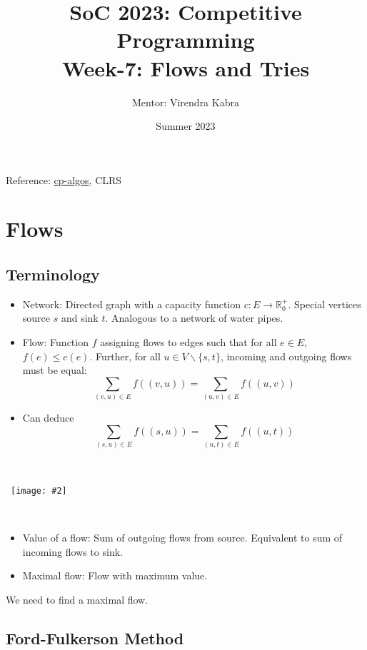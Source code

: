 \documentclass{article}
\title{\textbf{SoC 2023: Competitive Programming \\ {\Large Week-7: Flows and Tries}}}
\author{Mentor: Virendra Kabra}
\date{Summer 2023}
\newcommand{\image}[2]{\
    \begin{center}\
        \texttt{[image: \#2]}\
    \end{center}\
}
\begin{document}
\begin{sloppypar}       %

    \maketitle
    \tableofcontents
    \thispagestyle{empty}

    \newpage

    \noindent Reference: \href{https://cp-algorithms.com/graph/edmonds_karp.html}{cp-algos}, CLRS

    \section{Flows}

    \subsection{Terminology}

    \begin{itemize}
        \item Network: Directed graph with a capacity function $c:E\rightarrow \mathbb{R}^+_0$. Special vertices source $s$ and sink $t$. Analogous to a network of water pipes.
        \item Flow: Function $f$ assigning flows to edges such that for all $e\in E$, $f(e) \le c(e)$. Further, for all $u\in V\backslash \{s,t\}$, incoming and outgoing flows must be equal:
        $$\sum_{(v,u)\in E}f((v,u)) = \sum_{(u,v)\in E}f((u,v))$$
        \item Can deduce $$\sum_{(s,u)\in E}f((s,u)) = \sum_{(u,t)\in E}f((u,t))$$
    \end{itemize}

    \image{0.6}{../images/Flow1.png}

    \begin{itemize}
        \item Value of a flow: Sum of outgoing flows from source. Equivalent to sum of incoming flows to sink.
        \item Maximal flow: Flow with maximum value.
    \end{itemize}

    We need to find a maximal flow.

    \subsection{Ford-Fulkerson Method}


\end{sloppypar}
\end{document}
